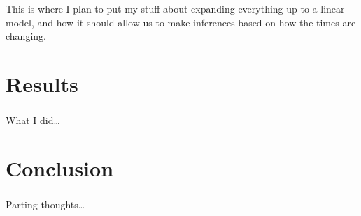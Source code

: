 \documentclass[aspectratio=169]{beamer}
\begin{document}
\begin{frame} \frametitle{\insertsection}

    This is where I plan to put my stuff about
    expanding everything up to a linear model,
    and how it should allow us to make inferences
    based on how the times are changing.

\end{frame}

\section{Results}

\begin{frame} \frametitle{\insertsection}

    What I did\ldots

\end{frame}

\section{Conclusion}

\begin{frame} \frametitle{\insertsection}

    Parting thoughts\ldots

\end{frame}
\end{document}
